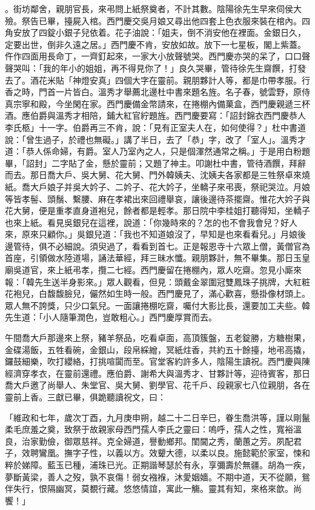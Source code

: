 \begin{showcontents}{}
。街坊鄰舍，親朋官長，來弔問上紙祭奠者，不計其數。陰陽徐先生早來伺侯大殮。祭告已畢，擡屍入棺。西門慶交吳月娘又尋出他四套上色衣服來裝在棺內。四角安放了四錠小銀子兒依着。花子油說：「姐夫，倒不消安他在裡面。金銀日久，定要出世，倒非久遠之居。」西門慶不肯，安放如故。放下一七星板，閣上紫蓋。仵作四面用長命丁，一齊釘起來，一家大小放聲號哭。西門慶亦哭的呆了，口口聲聲哭叫：「我的年小的姐姐，再不得見你了！」良久哭畢，管待徐先生齋饌，打發去了。酒花米貼「神燈安真」四個大字在靈前。親朋夥計人等，都是巾帶孝服。行香之時，門首一片皆白。溫秀才舉薦北邊杜中書來題名旌。名子春，號雲野，原侍真宗寧和殿，今坐閑在家。西門慶備金幣請來，在捲棚內備菓盒，西門慶親遞三杯酒。應伯爵與溫秀才相陪，鋪大紅官紵題旌。西門慶要寫：「詔封錦衣西門慶恭人李氏柩」十一字。伯爵再三不肯，說：「見有正室夫人在，如何使得？」杜中書道說：「曾生過子，於禮也無礙。」講了半日，去了「恭」字，改了「室人」。溫秀才道：「恭人係命婦，有爵。室人乃室內之人，只是個渾然通常之稱。」于是用白粉題畢，「詔封」二字貼了金，懸於靈前；又題了神主。叩謝杜中書，管待酒饌，拜辭而去。那日喬大戶、吳大舅、花大舅、門外韓姨夫、沈姨夫各家都是三牲祭卓來燒紙。喬大戶娘子并吳大妗子、二妗子、花大妗子，坐轎子來弔喪，祭祀哭泣。月娘等皆孝髻、頭鬚、繫腰、麻在孝裙出來回禮舉哀，讓後邊待茶擺齋。惟花大妗子與花大舅，便是重孝直身道袍兒，餘者都是輕孝。那日院中李桂姐打聽得知，坐轎子也來上紙。看見吳銀兒在這裡，說道：「你幾時來的？怎的也不會我會兒？好人來，原來只顧你。」吳銀兒道：「我也不知道娘沒了，早知是也來看看兒。」月娘後邊管待，俱不必細說。須臾過了，看看到首七。正是報恩寺十六眾上僧，黃僧官為首座，引領做水陸道場，誦法華經，拜三昧水懺。親朋夥計，無不畢集。那日玉皇廟吳道官，來上紙弔孝，攬二七經。西門慶留在捲棚內，眾人吃齋。忽見小廝來報：「韓先生送半身影來。」眾人觀看，但見：頭戴金翠圍冠雙鳳珠子挑牌，大紅粧花袍兒，白馥馥臉兒，儼然如生時一般。西門慶見了，滿心歡喜，懸掛像材頭上。眾人無不誇獎，只少口氣兒。一面讓捲棚吃齋，囑付大影比長，還要加工夫些。韓先生道：「小人隨筆潤色，豈敢粗心。」西門慶厚賞而去。

午間喬大戶那邊來上祭，豬羊祭品，吃看卓面，高頂簇盤，五老錠勝，方糖樹果，金碟湯飯，五牲看碗，金銀山，段帛綵繒，冥紙炷香，共約五十餘擡，地弔高撬，鑼鼓細樂，吹打纓絡，打挑喧闐而至。官堂客約許多人，陰陽生讀祝。西門慶與陳經濟穿孝衣，在靈前還禮。應伯爵、謝希大與溫秀才、甘夥計等，迎待賓客，那日喬大戶邀了尚舉人、朱堂官、吳大舅、劉學官、花千戶、段親家七八位親朋，各在靈前上香。三獻已畢，俱跪聽讀祝文，曰：

「維政和七年，歲次丁酉，九月庚申朔，越二十二日辛巳，眷生喬洪等，謹以剛鬣柔毛庶羞之奠，致祭于故親家母西門孺人李氏之靈曰：嗚呼，孺人之性，寬裕溫良，治家勤儉，御眾慈祥。克全婦道，譽動鄉邦。閨閫之秀，蘭蕙之芳。夙配君子，效聘鸞凰。撫字子性，以義以方。效顰大德，以柔以良。施懿範於家室，悚和粹於娣障。藍玉已種，浦珠已光。正期諧琴瑟於有永，享彌壽於無疆。胡為一疾，夢斷黃梁，善人之歿，孰不哀傷！弱女襁褓，沐愛姻嬙。不期中道，天不從願，鴛伴失行，恨隔幽冥，莫覩行藏。悠悠情誼，寓此一觴。靈其有知，來格來歆。尚饗！」


\end{showcontents}
